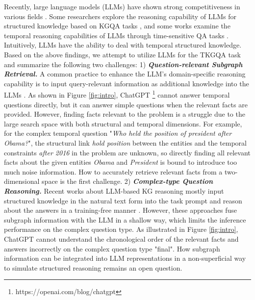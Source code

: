 \documentclass[11pt]{article}
\begin{document}
Recently, large language models (LLMs) have shown strong competitiveness in various fields \cite{NLP1,NLP2}. Some researchers explore the reasoning capability of LLMs for structured knowledge based on KGQA tasks \cite{zeroshotQA,KG-GPT}, and some works examine the temporal reasoning capabilities of LLMs through time-sensitive QA tasks \cite{timeqa,TEMPReason}. Intuitively, LLMs have the ability to deal with temporal structured knowledge.
Based on the above findings, we attempt to utilize LLMs for the TKGQA task and summarize the following two challenges:
1) \textbf{\textit{Question-relevant Subgraph Retrieval.}} 
A common practice to enhance the LLM's domain-specific reasoning capability is to input query-relevant information as additional knowledge into the LLMs \cite{chatdb}. 
As shown in Figure \ref{fig:intro}, ChatGPT \footnote{https://openai.com/blog/chatgpt} cannot answer temporal questions directly, but it can answer simple questions when the relevant facts are provided.
However, finding facts relevant to the problem is a struggle due to the large search space with both structural and temporal dimensions.
For example, for the complex temporal question "\textit{Who held the position of president after Obama?}", the structural link \textit{hold position} between the entities and the temporal constraints \textit{after 2016} in the problem are unknown, so directly finding all relevant facts about the given entities \textit{Obama} and \textit{President} is bound to introduce too much noise information.
How to accurately retrieve relevant facts from a two-dimensional space is the first challenge.
2) \textbf{\textit{Complex-type Question Reasoning.}}
Recent works about LLM-based KG reasoning mostly input structured knowledge in the natural text form into the task prompt and reason about the answers in a training-free manner \cite{LLMstudy}.
However, these approaches fuse subgraph information with the LLM in a shallow way, which limits the inference performance on the complex question type.
As illustrated in Figure \ref{fig:intro}, ChatGPT cannot understand the chronological order of the relevant facts and answers incorrectly on the complex question type "final".
How subgraph information can be integrated into LLM representations in a non-superficial way to simulate structured reasoning remains an open question.
\end{document}

